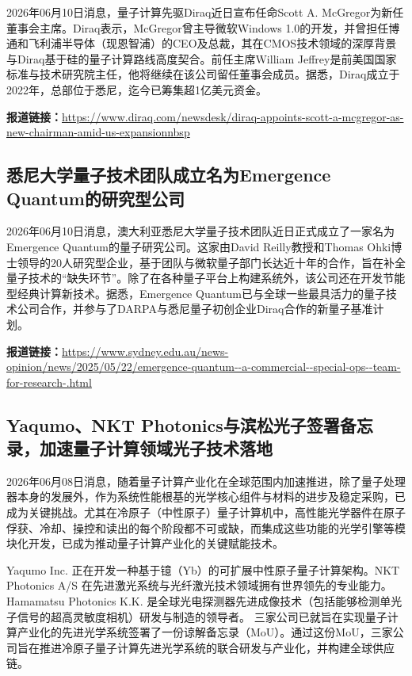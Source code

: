 \documentclass[12pt,a4paper]{ctexart}
\begin{document}
2026年06月10日消息，量子计算先驱Diraq近日宣布任命Scott A. McGregor为新任董事会主席。Diraq表示，McGregor曾主导微软Windows 1.0的开发，并曾担任博通和飞利浦半导体（现恩智浦）的CEO及总裁，其在CMOS技术领域的深厚背景与Diraq基于硅的量子计算路线高度契合。前任主席William Jeffrey是前美国国家标准与技术研究院主任，他将继续在该公司留任董事会成员。据悉，Diraq成立于2022年，总部位于悉尼，迄今已筹集超1亿美元资金。

\noindent\textbf{报道链接：}\url{https://www.diraq.com/newsdesk/diraq-appoints-scott-a-mcgregor-as-new-chairman-amid-us-expansionnbsp}

\subsection{ 悉尼大学量子技术团队成立名为Emergence Quantum的研究型公司 }

2026年06月10日消息，澳大利亚悉尼大学量子技术团队近日正式成立了一家名为Emergence Quantum的量子研究公司。这家由David Reilly教授和Thomas Ohki博士领导的20人研究型企业，基于团队与微软量子部门长达近十年的合作，旨在补全量子技术的“缺失环节”。除了在各种量子平台上构建系统外，该公司还在开发节能型经典计算新技术。据悉，Emergence Quantum已与全球一些最具活力的量子技术公司合作，并参与了DARPA与悉尼量子初创企业Diraq合作的新量子基准计划。

\noindent\textbf{报道链接：}\url{https://www.sydney.edu.au/news-opinion/news/2025/05/22/emergence-quantum--a-commercial--special-ops--team-for-research-.html}

\subsection{ Yaqumo、NKT Photonics与滨松光子签署备忘录，加速量子计算领域光子技术落地 }

2026年06月08日消息，随着量子计算产业化在全球范围内加速推进，除了量子处理器本身的发展外，作为系统性能根基的光学核心组件与材料的进步及稳定采购，已成为关键挑战。尤其在冷原子（中性原子）量子计算机中，高性能光学器件在原子俘获、冷却、操控和读出的每个阶段都不可或缺，而集成这些功能的光学引擎等模块化开发，已成为推动量子计算产业化的关键赋能技术。

Yaqumo Inc. 正在开发一种基于镱（Yb）的可扩展中性原子量子计算架构。NKT Photonics A/S 在先进激光系统与光纤激光技术领域拥有世界领先的专业能力。Hamamatsu Photonics K.K. 是全球光电探测器先进成像技术（包括能够检测单光子信号的超高灵敏度相机）研发与制造的领导者。
三家公司已就旨在实现量子计算产业化的先进光学系统签署了一份谅解备忘录（MoU）。通过这份MoU，三家公司旨在推进冷原子量子计算先进光学系统的联合研发与产业化，并构建全球供应链。
\end{document}
